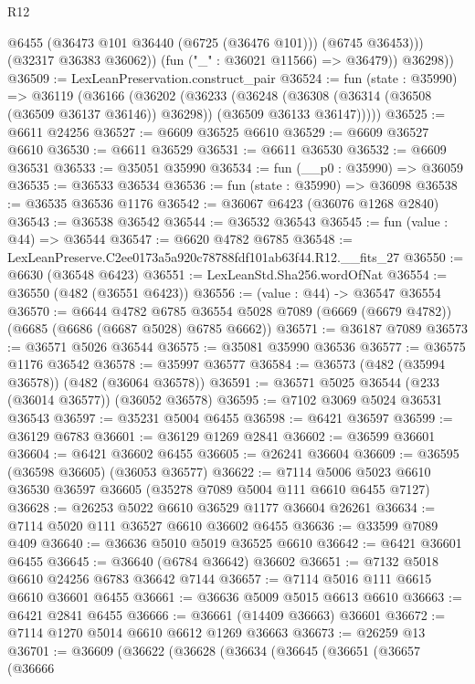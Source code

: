 \begin{lexlean}{R12}
\begin{coremodule}
                @6455
                (@36473 @101 @36440 (@6725 (@36476 @101)))
                (@6745 @36453)))
            (@32317 @36383 @36062))
          (fun ("_" : @36021 @11566) => @36479))
        @36298))
@36509 := LexLeanPreservation.construct_pair
@36524 := fun (state : @35990) =>
  @36119
    (@36166
      (@36202
        (@36233
          (@36248
            (@36308 (@36314 (@36508 (@36509 @36137 @36146)) @36298))
            (@36509 @36133 @36147)))))
@36525 := @6611 @24256
@36527 := @6609 @36525 @6610
@36529 := @6609 @36527 @6610
@36530 := @6611 @36529
@36531 := @6611 @36530
@36532 := @6609 @36531
@36533 := @35051 @35990
@36534 := fun (__p0 : @35990) => @36059
@36535 := @36533 @36534
@36536 := fun (state : @35990) => @36098
@36538 := @36535 @36536 @1176
@36542 := @36067 @6423 (@36076 @1268 @2840)
@36543 := @36538 @36542
@36544 := @36532 @36543
@36545 := fun (value : @44) => @36544
@36547 := @6620 @4782 @6785
@36548 := LexLeanPreserve.C2ee0173a5a920c78788fdf101ab63f44.R12.__fits_27
@36550 := @6630 (@36548 @6423)
@36551 := LexLeanStd.Sha256.wordOfNat
@36554 := @36550 (@482 (@36551 @6423))
@36556 := (value : @44) -> @36547 @36554
@36570 := @6644
    @4782
    @6785
    @36554
    @5028
    @7089
    (@6669 (@6679 @4782))
    (@6685 (@6686 (@6687 @5028) @6785 @6662))
@36571 := @36187 @7089
@36573 := @36571 @5026 @36544
@36575 := @35081 @35990 @36536
@36577 := @36575 @1176 @36542
@36578 := @35997 @36577
@36584 := @36573 (@482 (@35994 @36578)) (@482 (@36064 @36578))
@36591 := @36571 @5025 @36544 (@233 (@36014 @36577)) (@36052 @36578)
@36595 := @7102 @3069 @5024 @36531 @36543
@36597 := @35231 @5004 @6455
@36598 := @6421 @36597
@36599 := @36129 @6783
@36601 := @36129 @1269 @2841
@36602 := @36599 @36601
@36604 := @6421 @36602 @6455
@36605 := @26241 @36604
@36609 := @36595 (@36598 @36605) (@36053 @36577)
@36622 := @7114 @5006 @5023 @6610 @36530 @36597 @36605 (@35278 @7089 @5004 @111 @6610 @6455 @7127)
@36628 := @26253 @5022 @6610 @36529 @1177 @36604 @26261
@36634 := @7114 @5020 @111 @36527 @6610 @36602 @6455
@36636 := @33599 @7089 @409
@36640 := @36636 @5010 @5019 @36525 @6610
@36642 := @6421 @36601 @6455
@36645 := @36640 (@6784 @36642) @36602
@36651 := @7132 @5018 @6610 @24256 @6783 @36642 @7144
@36657 := @7114 @5016 @111 @6615 @6610 @36601 @6455
@36661 := @36636 @5009 @5015 @6613 @6610
@36663 := @6421 @2841 @6455
@36666 := @36661 (@14409 @36663) @36601
@36672 := @7114 @1270 @5014 @6610 @6612 @1269 @36663
@36673 := @26259 @13
@36701 := @36609
    (@36622
      (@36628
        (@36634
          (@36645
            (@36651
              (@36657
                (@36666

\end{coremodule}
\end{lexlean}
